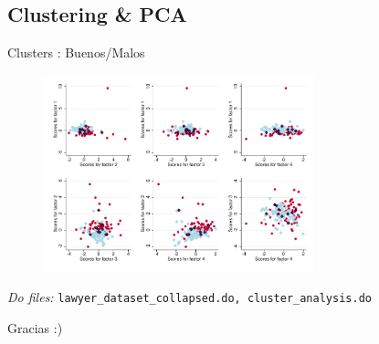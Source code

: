 \documentclass[8pt]{beamer}
\begin{document}
\subsection{Clustering  \&  PCA}
\begin{frame}{Clusters : Buenos/Malos}
    \begin{figure}[H]
    \begin{center}
        \includegraphics[width=0.7\textwidth]{Figuras/cluster_2.pdf}
        \end{center}
\end{figure}
 \textit{Do files: } \texttt{lawyer\_dataset\_collapsed.do, cluster\_analysis.do}
\end{frame}

\begin{frame}{Gracias :)}
    
\end{frame}
\end{document}
